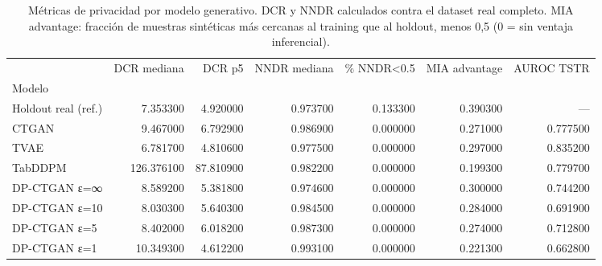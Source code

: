 \begin{table}
\caption{Métricas de privacidad por modelo generativo. DCR y NNDR calculados contra el dataset real completo. MIA advantage: fracción de muestras sintéticas más cercanas al training que al holdout, menos 0,5 (0 = sin ventaja inferencial).}
\label{tab:privacidad_summary}
\begin{tabular}{lrrrrrr}
\toprule
 & DCR mediana & DCR p5 & NNDR mediana & \% NNDR<0.5 & MIA advantage & AUROC TSTR \\
Modelo &  &  &  &  &  &  \\
\midrule
Holdout real (ref.) & 7.353300 & 4.920000 & 0.973700 & 0.133300 & 0.390300 & --- \\
CTGAN & 9.467000 & 6.792900 & 0.986900 & 0.000000 & 0.271000 & 0.777500 \\
TVAE & 6.781700 & 4.810600 & 0.977500 & 0.000000 & 0.297000 & 0.835200 \\
TabDDPM & 126.376100 & 87.810900 & 0.982200 & 0.000000 & 0.199300 & 0.779700 \\
DP-CTGAN ε=∞ & 8.589200 & 5.381800 & 0.974600 & 0.000000 & 0.300000 & 0.744200 \\
DP-CTGAN ε=10 & 8.030300 & 5.640300 & 0.984500 & 0.000000 & 0.284000 & 0.691900 \\
DP-CTGAN ε=5 & 8.402000 & 6.018200 & 0.987300 & 0.000000 & 0.274000 & 0.712800 \\
DP-CTGAN ε=1 & 10.349300 & 4.612200 & 0.993100 & 0.000000 & 0.221300 & 0.662800 \\
\bottomrule
\end{tabular}
\end{table}
